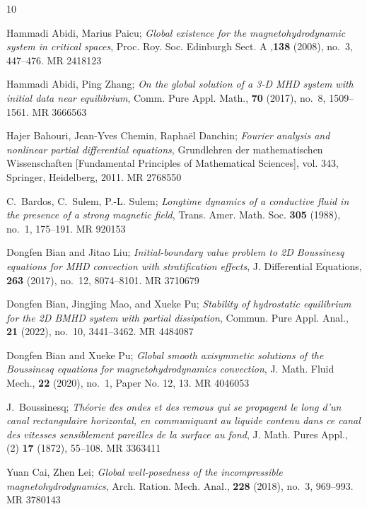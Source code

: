\documentclass[reqno]{amsart}
\begin{document}
\begin{thebibliography}{10}

Hammadi Abidi, Marius Paicu; 
\emph{Global existence for the
 magnetohydrodynamic system in critical spaces}, Proc. Roy. Soc. Edinburgh
 Sect. A ,\textbf{138} (2008), no.~3, 447--476. MR {2418123}

Hammadi Abidi, Ping Zhang; 
\emph{On the global solution of a 3-{D} {MHD}
 system with initial data near equilibrium}, Comm. Pure Appl. Math.,
 \textbf{70} (2017), no.~8, 1509--1561. MR {3666563}

Hajer Bahouri, Jean-Yves Chemin, Rapha\"{e}l Danchin; 
\emph{Fourier  analysis and nonlinear partial differential equations}, 
Grundlehren der  mathematischen Wissenschaften [Fundamental Principles of Mathematical
 Sciences], vol. 343, Springer, Heidelberg, 2011. MR {2768550}

C.~Bardos, C.~Sulem, P.-L. Sulem; 
\emph{Longtime dynamics of a conductive
 fluid in the presence of a strong magnetic field}, Trans. Amer. Math. Soc.
 \textbf{305} (1988), no.~1, 175--191. MR {920153}

Dongfen Bian and Jitao Liu; 
\emph{Initial-boundary value problem to 2{D}
 {B}oussinesq equations for {MHD} convection with stratification effects}, J.
 Differential Equations, \textbf{263} (2017), no.~12, 8074--8101. MR {3710679}

Dongfen Bian, Jingjing Mao, and Xueke Pu; 
\emph{Stability of hydrostatic
 equilibrium for the 2{D} {BMHD} system with partial dissipation}, Commun.
 Pure Appl. Anal., \textbf{21} (2022), no.~10, 3441--3462. MR {4484087}

Dongfen Bian and Xueke Pu; 
\emph{Global smooth axisymmetic solutions of the
 {B}oussinesq equations for magnetohydrodynamics convection}, 
J. Math. Fluid  Mech., \textbf{22} (2020), no.~1, Paper No. 12, 13. MR {4046053}

J.~Boussinesq; 
\emph{Th\'eorie des ondes et des remous qui se propagent le
 long d'un canal rectangulaire horizontal, en communiquant au liquide contenu
 dans ce canal des vitesses sensiblement pareilles de la surface au fond}, J.
 Math. Pures Appl., (2) \textbf{17} (1872), 55--108. MR {3363411}

Yuan Cai, Zhen Lei; 
\emph{Global well-posedness of the incompressible
 magnetohydrodynamics}, Arch. Ration. Mech. Anal., \textbf{228} (2018), no.~3,
 969--993. MR {3780143}


\end{thebibliography}
\end{document}
